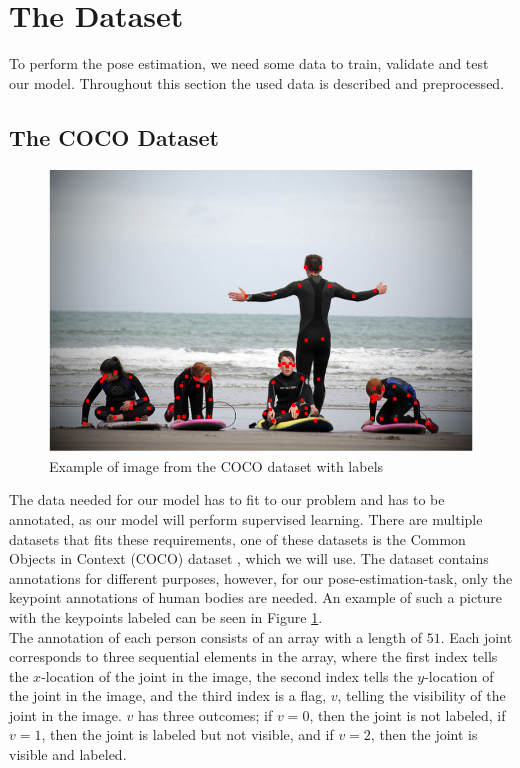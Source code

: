 \documentclass[main.tex]{subfiles}
\begin{document}
\section{The Dataset}
To perform the pose estimation, we need some data to train, validate and test our model. Throughout this section the used data is described and preprocessed.

\subsection{The COCO Dataset}
\begin{figure}[H]
    \centering
    \includegraphics[height = 4 cm]{../entities/coco_example.png}
    \caption{Example of image from the COCO dataset with labels}
    \label{fig:coco_example}
\end{figure}
The data needed for our model has to fit to our problem and has to be annotated, as our model will perform supervised learning. There are multiple datasets that fits these requirements, one of these datasets is the Common Objects in Context (COCO) dataset \cite{COCO_article}, which we will use. The dataset contains annotations for different purposes, however, for our pose-estimation-task, only the keypoint annotations of human bodies are needed. An example of such a picture with the keypoints labeled can be seen in Figure \ref{fig:coco_example}. \\
The annotation of each person consists of an array with a length of $51$. Each joint corresponds to three sequential elements in the array, where the first index tells the $x$-location of the joint in the image, the second index tells the $y$-location of the joint in the image, and the third index is a flag, $v$, telling the visibility of the joint in the image. $v$ has three outcomes; if $v = 0$, then the joint is not labeled, if $v = 1$, then the joint is labeled but not visible, and if $v = 2$, then the joint is visible and labeled. \\
\end{document}
